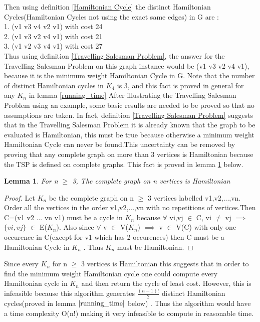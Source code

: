 \documentclass{article}
\newtheorem{lemma}[definition]{Lemma}
\begin{document}
Then using definition \ref{Hamiltonian Cycle} the distinct Hamiltonian Cycles(Hamiltonian Cycles not using the exact same edges) in G are  :\\
1. (v1 v3 v4 v2 v1) with cost 24\\
2. (v1 v3 v2 v4 v1) with cost 21\\
3. (v1 v2 v3 v4 v1) with cost 27\\
Thus using definition \ref{Travelling Salesman Problem}, the answer for the Travelling Salesman Problem on this graph instance would be (v1 v3 v2 v4 v1), because it is the minimum weight Hamiltonian Cycle in G. Note that the number of distinct Hamiltonian cycles in $K_4$ is 3, and this fact is proved in general for any $K_n$ in lemma \ref{running_time}
\newpage
After illustrating the Travelling Salesman Problem using an example, some basic results are needed to be proved so that no assumptions are taken. In fact, definition \ref{Travelling Salesman Problem} suggests that in the Travelling Salesman Problem it is already known that the graph to be evaluated is Hamiltonian, this must be true because otherwise a minimum weight Hamiltonian Cycle can never be found.This uncertainty can be removed by proving that any complete graph on more than 3 vertices is Hamiltonian because the TSP is defined on complete graphs. This fact is proved in lemma \ref{Kn is Hamiltonian} below.
\begin{lemma}
\label{Kn is Hamiltonian}
For n $\geq$ 3, The complete graph on n vertices is Hamiltonian
\end{lemma}
\begin{proof}
Let $K_n$ be the complete graph on n $\geq$ 3 vertices labelled v1,v2,...,vn. Order all the vertices in the order v1,v2,...,vn with no repetitions of vertices.Then C=(v1 v2 ... vn v1) must be a cycle in $K_n$ because $\forall$ vi,vj $\in$ C, vi $\ne$ vj $\implies$ $\{vi,vj\}$ $\in$ E($K_n$). Also since $\forall$ v $\in$ V($K_n$) $\implies$ v $\in$ V(C) with only one occurence in C(except for v1 which has 2 occurences) then C must be a Hamiltonian Cycle in $K_n$ . Thus $K_n$ must be Hamiltonian.
\end{proof}
Since every $K_n$ for n $\geq$ 3 vertices is Hamiltonian this suggests that in order to find the minimum weight Hamiltonian cycle one could compute every Hamiltonian cycle in $K_n$ and then return the cycle of least cost. However, this is infeasible because this algorithm generates $\frac{(n-1)!}{2}$ distinct Hamiltonian cycles(proved in  lemma $\ref{running_time}$ below) . Thus the algorithm would have a time complexity O(n!) making it very infeasible to compute in reasonable time.\cite{geeksforgeeks_2018}
\end{document}
